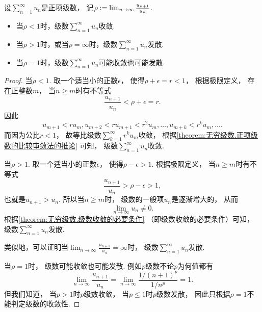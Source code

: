 \begin{theorem}\label{theorem:无穷级数.正项级数的比值审敛法}
设\(\sum_{n=1}^\infty u_n\)是正项级数，
记\(\rho := \lim_{n\to\infty} \frac{u_{n+1}}{u_n}\).
\begin{itemize}
	\item 当\(\rho<1\)时，级数\(\sum_{n=1}^\infty u_n\)收敛.
	\item 当\(\rho>1\)时，或当\(\rho=\infty\)时，级数\(\sum_{n=1}^\infty u_n\)发散.
	\item 当\(\rho=1\)时，级数\(\sum_{n=1}^\infty u_n\)可能收敛也可能发散.
\end{itemize}
\begin{proof}
当\(\rho<1\).
取一个适当小的正数\(\epsilon\)，
使得\(\rho+\epsilon=r<1\)，
根据极限定义，
存在正整数\(m\)，
当\(n \geq m\)时有不等式\[
	\frac{u_{n+1}}{u_n} < \rho + \epsilon = r.
\]
因此\[
	u_{m+1} < r u_m,
	u_{m+2} < r u_{m+1} < r^2 u_m,
	\dotsc,
	u_{m+k} < r^k u_m,
	\dotsc.
\]
而因为公比\(r<1\)，
故等比级数\(\sum_{k=1}^\infty r^k u_m\)收敛，
根据\cref{theorem:无穷级数.正项级数的比较审敛法的推论} 可知，
级数\(\sum_{n=1}^\infty u_n\)收敛.

当\(\rho>1\).
取一个适当小的正数\(\epsilon\)，
使得\(\rho-\epsilon>1\).
根据极限定义，
当\(n \geq m\)时有不等式\[
	\frac{u_{n+1}}{u_n} > \rho-\epsilon > 1,
\]
也就是\(u_{n+1}>u_n\).
所以当\(n \geq m\)时，
级数的一般项\(u_n\)是逐渐增大的，
从而\[
	\lim_{n\to\infty} u_n \neq 0.
\]
根据\cref{theorem:无穷级数.级数收敛的必要条件} （即级数收敛的必要条件）可知，
级数\(\sum_{n=1}^\infty u_n\)发散.

类似地，可以证明当\(\lim_{n\to\infty} \frac{u_{n+1}}{u_n} = \infty\)时，
级数\(\sum_{n=1}^\infty u_n\)发散.

当\(\rho = 1\)时，
级数可能收敛也可能发散.
例如\(p\)级数不论\(p\)为何值都有\[
	\lim_{n\to\infty} \frac{u_{n+1}}{u_n}
	= \lim_{n\to\infty} \frac{1/(n+1)^p}{1/n^p} = 1.
\]
但我们知道，
当\(p>1\)时\(p\)级数收敛，
当\(p\leq1\)时\(p\)级数发散，
因此只根据\(\rho=1\)不能判定级数的收敛性.
\end{proof}
\end{theorem}

